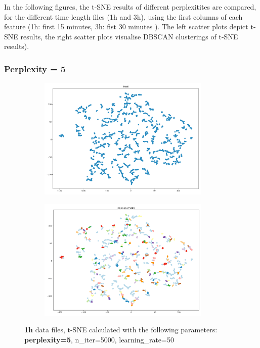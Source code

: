 
In the following figures, the t-SNE results of different perplexitites are compared, for the different time length files (1h and 3h), using the first columns of each feature (1h: first 15 minutes, 3h: fist 30 minutes ). The left scatter plots depict t-SNE results, the right scatter plots visualise DBSCAN clusterings of t-SNE results).

\subsubsection{Perplexity = 5}
\begin{figure}[H]
  \centering
  \begin{subfigure}{.5\textwidth}
    \centering
    \includegraphics[width=0.9\textwidth]{./images/tsneParametersTest/perplexity/perp5-1hTSNE.png}
  \end{subfigure}%
  \begin{subfigure}{.5\textwidth}
    \centering
    \includegraphics[width=0.9\textwidth]{./images/tsneParametersTest/perplexity/perp5-1hDBSCAN.png}
  \end{subfigure}
	\caption{\textbf{1h} data files, t-SNE calculated with the following parameters: \textbf{perplexity=5}, n\_iter=5000, learning\_rate=50}
	\label{figure:1hperp5TSNE}
\end{figure}


